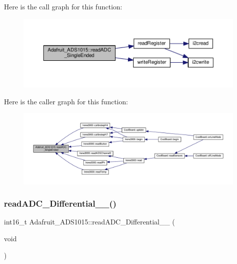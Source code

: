 Here is the call graph for this function\+:\nopagebreak
\begin{figure}[H]
\begin{center}
\leavevmode
\includegraphics[width=350pt]{df/df6/class_adafruit___a_d_s1015_a40f38b9e1f3ec397c0670dd632510235_cgraph}
\end{center}
\end{figure}
Here is the caller graph for this function\+:\nopagebreak
\begin{figure}[H]
\begin{center}
\leavevmode
\includegraphics[width=350pt]{df/df6/class_adafruit___a_d_s1015_a40f38b9e1f3ec397c0670dd632510235_icgraph}
\end{center}
\end{figure}
\mbox{\label{class_adafruit___a_d_s1015_a56582333958e66efaccd3d4a8a47e3ff}} 
\subsubsection{\texorpdfstring{read\+A\+D\+C\+\_\+\+Differential\+\_\+\_()}{readADC\_Differential\_0\_1()}}
{\footnotesize\ttfamily int16\+\_\+t Adafruit\+\_\+\+A\+D\+S1015\+::read\+A\+D\+C\+\_\+\+Differential\+\_\+\_ (\begin{DoxyParamCaption}\item[{void}]{ }\end{DoxyParamCaption})}



